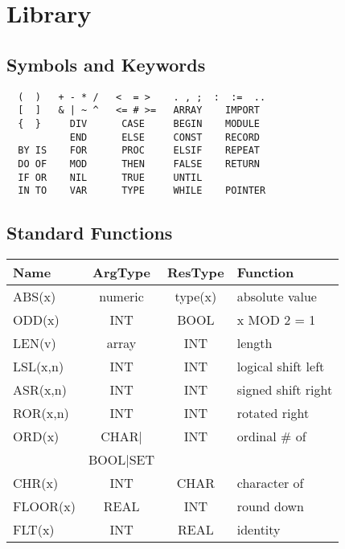 \chapter{Library}
\section{Symbols and Keywords}
\begin{verbatim}
  (  )   + - * /   <  = >    . , ;  :  :=  ..
  [  ]   & | ~ ^   <= # >=   ARRAY    IMPORT
  {  }     DIV      CASE     BEGIN    MODULE
           END      ELSE     CONST    RECORD
  BY IS    FOR      PROC     ELSIF    REPEAT
  DO OF    MOD      THEN     FALSE    RETURN
  IF OR    NIL      TRUE     UNTIL
  IN TO    VAR      TYPE     WHILE    POINTER
\end{verbatim}

\section{Standard Functions}
\begin{table}[h!]
  \centering
  \begin{tabular}{l c c l}
    Name     & ArgType & ResType& Function \\\hline
    ABS(x)   & numeric & type(x)& absolute value \\
    ODD(x)   & INT     & BOOL& x MOD 2 = 1 \\
    LEN(v)   & array   & INT & length \\
    LSL(x,n) & INT     & INT & logical shift left \\
    ASR(x,n) & INT     & INT & signed shift right \\
    ROR(x,n) & INT     & INT & rotated right \\
    ORD(x)   & CHAR|   & INT & ordinal \# of \\
             & BOOL|SET \\
    CHR(x)   & INT     & CHAR& character of \\
    FLOOR(x) & REAL    & INT & round down \\
    FLT(x)   & INT     & REAL& identity \\
  \end{tabular}
\end{table}

